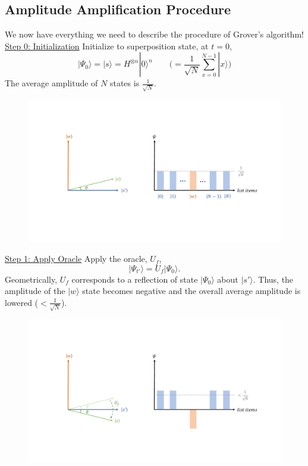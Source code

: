 \documentclass[11pt]{article} %
\begin{document}
\subsection{Amplitude Amplification Procedure}
We now have everything we need to describe the procedure of Grover's algorithm!
\newline
\newline
\underline{Step 0: Initialization}
\newline
Initialize to superposition state, at $t=0$, 
\begin{equation*}
    |\Psi_0\rangle=|s\rangle=H^{\otimes n}|0\rangle^n \qquad \Bigg(=\frac{1}{\sqrt{N}}\sum_{x=0}^{N-1}|x\rangle\Bigg)
\end{equation*}
The average amplitude of $N$ states is $\frac{1}{\sqrt{N}}$.
\begin{figure}[h!]
    \centering
    \includegraphics[width=.95\textwidth]{Lecture7Figs/step1.pdf}
    \label{fig:search_item}
\end{figure}
\newpage
\noindent\underline{Step 1: Apply Oracle}
\newline
Apply the oracle, $U_f$,
\begin{equation*}
    |\Psi_{t'}\rangle = U_f |\Psi_0\rangle.
\end{equation*}
Geometrically, $U_f$ corresponds to a reflection of state $|\Psi_0\rangle$ about $|s'\rangle$. Thus, the amplitude of the $|w\rangle$ state becomes negative and the overall average amplitude is lowered \big($<\frac{1}{\sqrt{N}}$\big).
\begin{figure}[h!]
    \centering
    \includegraphics[width=.95\textwidth]{Lecture7Figs/step2.pdf}
    \label{fig:search_item}
\end{figure}
\end{document}

